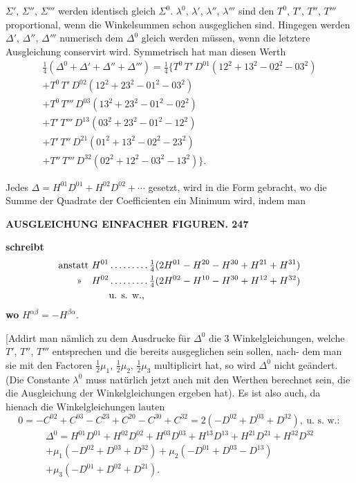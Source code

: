\documentclass[12pt,a4paper]{article}
\theoremstyle{plain}
\theoremstyle{definition}
\theoremstyle{remark}
\begin{document}
$\Sigma'$, $\Sigma''$, $\Sigma'''$ werden identisch gleich $\Sigma^0$. $\lambda^0$, $\lambda'$, $\lambda''$, $\lambda'''$ sind den $T^0$, $T'$, $T''$, $T'''$
proportional, wenn die Winkelsummen schon ausgeglichen sind. Hingegen
werden $\Delta'$, $\Delta''$, $\Delta'''$ numerisch dem $\Delta^0$ gleich werden m\"ussen, wenn die letztere
Ausgleichung conservirt wird. Symmetrisch hat man diesen Werth
\begin{multline*}
\tfrac{1}{4}(\Delta^0 + \Delta' + \Delta'' + \Delta''') = \tfrac{1}{4}\bigl\{ T^0\,T'\,D^{01}(12^2 + 13^2 - 02^2 - 03^2) \\
+ T^0\,T'\,D^{02}(12^2 + 23^2 - 01^2 - 03^2) \\
+ T^0\,T'''\,D^{03}(13^2 + 23^2 - 01^2 - 02^2) \\
+ T'\,T'''\,D^{13}(03^2 + 23^2 - 01^2 - 12^2) \\
+ T'\,T''\,D^{21}(01^2 + 13^2 - 02^2 - 23^2) \\
+ T''\,T'''\,D^{32}(02^2 + 12^2 - 03^2 - 13^2)\bigr\}.
\end{multline*}

Jedes $\Delta = H^{01} D^{01} + H^{02} D^{02} + \cdots$ gesetzt, wird in die Form gebracht, wo
die Summe der Quadrate der Coefficienten ein Minimum wird, indem man


\newpage

\noindent\textbf{AUSGLEICHUNG EINFACHER FIGUREN. 247}

\textbf{schreibt}
\begin{align*}
\text{anstatt } H^{01} &\ldots\ldots\ldots \tfrac{1}{4}(2H^{01} - H^{20} - H^{30} + H^{21} + H^{31}) \\
\text{>>\quad} H^{02} &\ldots\ldots\ldots \tfrac{1}{4}(2H^{02} - H^{10} - H^{30} + H^{12} + H^{32}) \\
&\text{u. s. w.,}
\end{align*}
\textbf{wo} $H^{\alpha\beta} = -H^{\beta\alpha}$.

[Addirt man n\"amlich zu dem Ausdrucke f\"ur $\Delta^0$ die 3 Winkelgleichungen,
welche $T'$, $T''$, $T'''$ entsprechen und die bereits ausgeglichen sein sollen, nach-
dem man sie mit den Factoren $\frac{1}{2}\mu_1$, $\frac{1}{2}\mu_2$, $\frac{1}{2}\mu_3$ multiplicirt hat, so wird $\Delta^0$
nicht ge\"andert. (Die Constante $\lambda^0$ muss nat\"urlich jetzt auch mit den Werthen
berechnet sein, die die Ausgleichung der Winkelgleichungen ergeben hat).
Es ist also auch, da hienach die Winkelgleichungen lauten
\[
0 = -C^{02} + C^{03} - C^{23} + C^{20} - C^{30} + C^{32} = 2(-D^{02} + D^{03} + D^{32}),\ \text{u. s. w.}:
\]
\begin{multline*}
\Delta^0 = H^{01} D^{01} + H^{02} D^{02} + H^{03} D^{03} + H^{13} D^{13} + H^{21} D^{21} + H^{32} D^{32} \\
+ \mu_1(-D^{02} + D^{03} + D^{32}) + \mu_2(-D^{01} + D^{03} - D^{13}) \\
+ \mu_3(-D^{01} + D^{02} + D^{21}).
\end{multline*}
\end{document}
